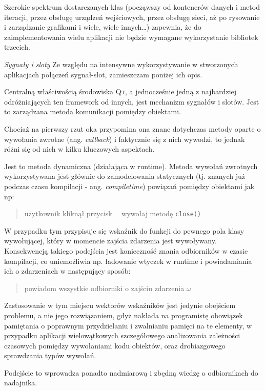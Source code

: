 Szerokie spektrum dostarczanych klas (począwszy od kontenerów danych i metod iteracji, przez obsługę urządzeń wejściowych, przez obsługę sieci, aż po rysowanie i zarządzanie grafikami i wiele, wiele innych\ldots) zapewnia, że do zaimplementowania wielu aplikacji nie będzie wymagane wykorzystanie bibliotek trzecich.

\textsl{Sygnały i sloty}
Ze względu na intensywne wykorzystywanie w stworzonych aplikacjach połączeń sygnał-slot, zamieszczam poniżej ich opis.

Centralną właściwością środowiska \textsc{Qt}, a jednocześnie jedną z najbardziej odróżniających ten framework od innych, jest mechanizm sygnałów i slotów. Jest to zarządzana metoda komunikacji pomiędzy obiektami.

Chociaż na pierwszy rzut oka przypomina ona znane dotychczas metody oparte o wywołania zwrotne (ang. \textsl{callback}) i faktycznie się z nich wywodzi, to jednak różni się od nich w kilku kluczowych aspektach.

Jest to metoda dynamiczna (działająca w runtime). Metoda wywołań zwrotnych wykorzystywana jest głównie do zamodelowania statycznych (tj. znanych już podczas czasu kompilacji - ang. \textsl{compiletime}) powiązań pomiędzy obiektami jak np:
\begin{verse}
użytkownik kliknął przycisk \texttimes~\textrightarrow~wywołaj metodę \texttt{close()}
\end{verse}

W przypadku tym przypisuje się wskaźnik do funkcji do pewnego pola klasy wywołującej, który w momencie zajścia zdarzenia jest wywoływany. Konsekwencją takiego podejścia jest konieczność znania odbiorników w czasie kompilacji, co uniemożliwia np. ładowanie wtyczek w runtime i powiadamiania ich o zdarzeniach w następujący sposób:
\begin{verse}
powiadom wszystkie odbiorniki o zajściu zdarzenia $\omega$
\end{verse}

Zastosowanie w tym miejscu wektorów wskaźników jest jedynie obejściem problemu, a nie jego rozwiązaniem, gdyż nakłada na programistę obowiązek pamiętania o poprawnym przydzielaniu i zwalnianiu pamięci na te elementy, w przypadku aplikacji wielowątkowych szczegółowego analizowania zależności czasowych pomiędzy wywołaniami kodu obiektów, oraz drobiazgowego sprawdzania typów wywołań.

Podejście to wprowadza ponadto nadmiarową i zbędną wiedzę o odbiornikach do nadajnika.

